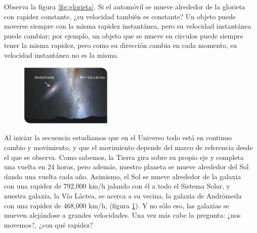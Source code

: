 \documentclass[11pt]{book}
\begin{document}
Observa la figura \ref{fig:glorieta}. Si el automóvil se mueve alrededor de la glorieta
con rapidez constante, ¿su velocidad también es constante? Un objeto puede moverse siempre
con la misma rapidez instantánea, pero su velocidad instantánea puede cambiar; por ejemplo,
un objeto que se mueve en círculos puede siempre tener la misma rapidez, pero como su dirección
cambia en cada momento, su velocidad instantánea no es la misma.

\begin{figure}[H]
    \centering
    \includegraphics[width=0.4\textwidth]{galax.jpg}
    \label{fig:galax}
\end{figure}

Al iniciar la secuencia estudiamos que en el Universo todo está en continuo cambio y movimiento,
y que el movimiento depende del marco de referencia desde el que se observa. Como sabemos,
la Tierra gira sobre su propio eje y completa una vuelta en 24 horas, pero además, nuestro
planeta se mueve alrededor del Sol dando una vuelta cada año. Asimismo, el Sol se mueve alrededor
de la galaxia con una rapidez de 792,000 km/h jalando con él a todo el Sistema Solar, y nuestra
galaxia, la Vía Láctea, se acerca a su vecina, la galaxia de Andrómeda con una rapidez de
468,000 km/h, (figura \ref{fig:galax}). Y no sólo eso, las galaxias se mueven alejándose a grandes
velocidades. Una vez más cabe la pregunta: ¿nos movemos?, ¿con qué rapidez?
\end{document}
